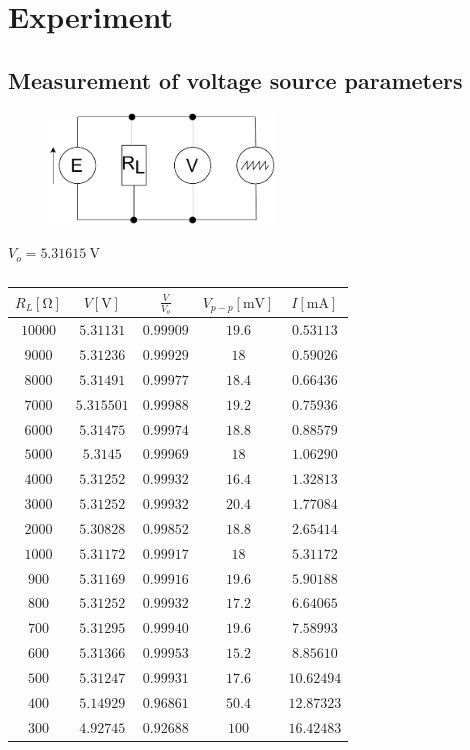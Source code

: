 \section{Experiment}

\subsection{Measurement of voltage source parameters}

\begin{figure}[H]
	\centering
	\includegraphics[width=6cm]{schematics/1.pdf}
	\caption{}
\end{figure}

$V_o=\SI{5.31615}{\volt}$

\begin{table}[H]
	\centering
	\begin{tabular}{ c | c | c | c | c}
		$R_L [\unit{\ohm}]$ & $V [\unit{\volt}]$ & $\frac{V}{V_o}$ & $V_{p-p}[\unit{\milli\volt}]$ & $I [\unit{\milli\ampere}]$ \\
		\hline
		$10000$ & $5.31131$ & $0.99909$ & $19.6$ & $0.53113$ \\
		$9000$ & $5.31236$ & $0.99929$ & $18$ & $0.59026$ \\
		$8000$ & $5.31491$ & $0.99977$ & $18.4$ & $0.66436$ \\
		$7000$ & $5.315501$ & $0.99988$ & $19.2$ & $0.75936$ \\
		$6000$ & $5.31475$ & $0.99974$ & $18.8$ & $0.88579$ \\
		$5000$ & $5.3145$ & $0.99969$ & $18$ & $1.06290$ \\
		$4000$ & $5.31252$ & $0.99932$ & $16.4$ & $1.32813$ \\
		$3000$ & $5.31252$ & $0.99932$ & $20.4$ & $1.77084$ \\
		$2000$ & $5.30828$ & $0.99852$ & $18.8$ & $2.65414$ \\
		$1000$ & $5.31172$ & $0.99917$ & $18$ & $5.31172$ \\
		$900$ & $5.31169$ & $0.99916$ & $19.6$ & $5.90188$ \\
		$800$ & $5.31252$ & $0.99932$ & $17.2$ & $6.64065$ \\
		$700$ & $5.31295$ & $0.99940$ & $19.6$ & $7.58993$ \\
		$600$ & $5.31366$ & $0.99953$ & $15.2$ & $8.85610$ \\
		$500$ & $5.31247$ & $0.99931$ & $17.6$ & $10.62494$ \\
		$400$ & $5.14929$ & $0.96861$ & $50.4$ & $12.87323$ \\
		$300$ & $4.92745$ & $0.92688$ & $100$ & $16.42483$ \\ 
	\end{tabular}
	\caption{}
\end{table}

